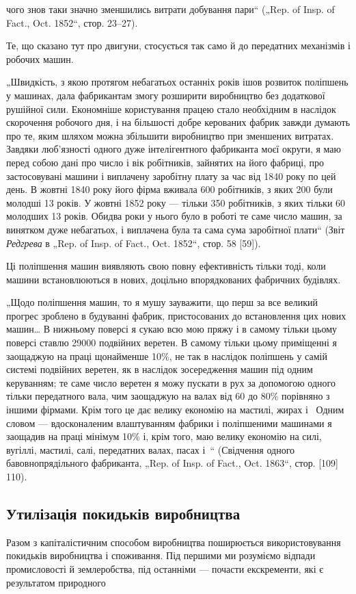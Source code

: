 \parcont{}  %
чого знов таки значно зменшились витрати добування пари“
(„Rep. of Insp. of Fact., Oct. 1852“, стор. 23--27).

Те, що сказано тут про двигуни, стосується так само й до
передатних механізмів і робочих машин.

„Швидкість, з якою протягом небагатьох останніх років
ішов розвиток поліпшень у машинах, дала фабрикантам змогу
розширити виробництво без додаткової рушійної сили. Економніше користування працею стало необхідним
в наслідок скорочення робочого дня, і на більшості добре керованих фабрик завжди думають про те,
яким шляхом можна збільшити
виробництво при зменшених витратах. Завдяки люб’язності одного
дуже інтелігентного фабриканта моєї округи, я маю перед собою дані про число і вік робітників,
зайнятих на його фабриці,
про застосовувані машини і виплачену заробітну плату за час
від 1840 року по цей день. В жовтні 1840 року його фірма
вживала 600 робітників, з яких 200 були молодші 13 років.
У жовтні 1852 року — тільки 350 робітників, з яких тільки 60
молодших 13 років. Обидва роки у нього було в роботі те саме
число машин, за винятком дуже небагатьох, і виплачена була та
сама сума заробітної плати“ (Звіт \emph{Редгрева} в „Rep. of Insp. of
Fact., Oct. 1852“, стор. 58 [59]).

Ці поліпшення машин виявляють свою повну ефективність
тільки тоді, коли машини встановлюються в нових, доцільно
впорядкованих фабричних будівлях.

„Щодо поліпшення машин, то я мушу зауважити, що перш
за все великий прогрес зроблено в будуванні фабрик, пристосованих до встановлення цих нових машин\dots{}
В нижньому поверсі
я сукаю всю мою пряжу і в самому тільки цьому поверсі
ставлю \num{29000} подвійних веретен. В самому тільки цьому приміщенні я заощаджую на праці щонайменше
10\%, не так в наслідок поліпшень у самій системі подвійних веретен, як в наслідок зосередження машин
під одним керуванням; те саме число
веретен я можу пускати в рух за допомогою одного тільки
передатного вала, чим заощаджую на валах від 60 до 80\% порівняно з іншими фірмами. Крім того це дає
велику економію
на мастилі, жирах і~ Одним словом — вдосконаленим
влаштуванням фабрики і поліпшеними машинами я заощадив на
праці мінімум 10\% і, крім того, маю велику економію на силі,
вугіллі, мастилі, салі, передатних валах, пасах і~“ (Свідчення
одного бавовнопрядільного фабриканта, „Rep. of Insp. of Fact.,
Oct. 1863“, стор. [109] 110).

\subsection{Утилізація покидьків виробництва}

Разом з капіталістичним способом виробництва поширюється
використовування покидьків виробництва і споживання. Під першими ми розуміємо відпади промисловості
й землеробства, під
останніми — почасти екскременти, які є результатом природного
\parbreak{}  %
